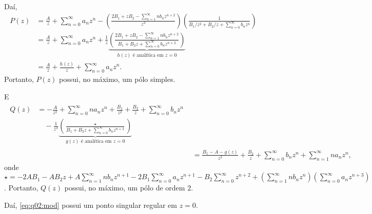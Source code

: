 \documentclass[a4paper,12pt, leqno, answers]{exam}
\begin{document}
\begin{questions}
\begin{parts}
\begin{solution}
            Da\'{i},
            \begin{align*}
                P(z) &= \frac{A}{z} + \sum_{n = 0}^\infty a_n z^n - \left( \frac{2 B_1 + z B_2 - \sum_{n = 1}^\infty n b_n z^{n + 2}}{z^3} \right) \left( \frac{1}{B_1 /z^2 + B_2/z + \sum_{n = 0}^\infty b_n z^n} \right) \\
                &= \frac{A}{z} + \sum_{n = 0}^\infty a_n z^n + \frac{1}{z} \underbrace{\left( \frac{2 B_1 + z B_2 - \sum_{n = 1}^\infty n b_n z^{n + 2}}{B_1 + B_2 z + \sum_{n = 0}^\infty b_n z^{n + 2}} \right)}_{h(z) \text{ \'{e} anal\'{i}tica em } z = 0} \\
                &= \frac{A}{z} + \frac{h(z)}{z} + \sum_{n = 0}^\infty a_n z^n.
            \end{align*}
            Portanto, $P(z)$ possui, no m\'{a}ximo, um p\'{o}lo simples.

            E
            \begin{align*}
                \begin{split}
                    Q(z) &= -\frac{A}{z^2} + \sum_{n = 0}^\infty n a_n z^n + \frac{B_1}{z^2} + \frac{B_2}{z} + \sum_{n = 0}^\infty b_n z^n \\
                    & \quad - \frac{1}{z^2} \underbrace{\left( \frac{\star}{B_1 + B_2 z + \sum_{n = 0}^\infty b_n z^{n + 2}} \right)}_{g(z) \text{ \'{e} anal\'{i}tica em } z = 0} 
                \end{split} \\
                &= \frac{B_1 - A - g(z)}{z^2} + \frac{B_2}{z} + \sum_{n = 0}^\infty b_n z^n + \sum_{n = 1}^\infty n a_n z^n,
            \end{align*}
            onde $\star = -2A B_1 - A B_2 z + A \sum_{n = 1}^\infty n b_n z^{n + 1} - 2 B_1 \sum_{n = 0}^\infty a_n z^{n + 1} - B_2 \sum_{n = 0}^\infty z^{n + 2} + \left( \sum_{n = 1}^\infty n b_n z^n \right) \left( \sum_{n = 0}^\infty a_n z^{n + 3} \right)$. Portanto, $Q(z)$ possui, no m\'{a}ximo, um p\'{o}lo de ordem $2$.

            Da\'{i}, \eqref{eq:q02:mod} possui um ponto singular regular em $z = 0$.
        \end{solution}


\end{parts}
\end{questions}
\end{document}
